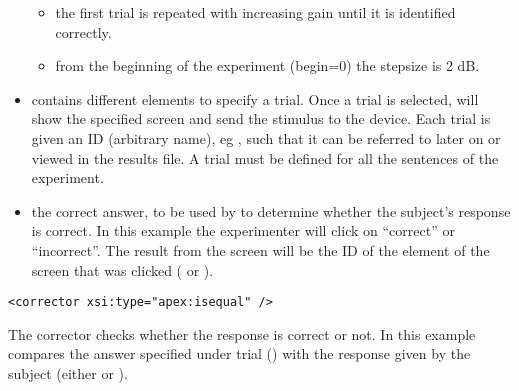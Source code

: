 \begin{itemize}
\begin{itemize}
\item {} the first trial is
repeated with increasing gain until it is identified correctly.

\item {} from the beginning of the experiment
(begin=0) the stepsize is 2 dB.
\end{itemize}

\item {} contains different  elements
to specify a trial. Once a trial is selected, 
will show the specified screen and send the stimulus to the
device. Each trial is given an ID (arbitrary name), eg
, such that it can be referred to later on or
viewed in the results file. A trial must be defined for all the
sentences of the experiment.

\item {} the correct answer, to be used by \apex to
determine whether the subject's response is correct. In this
example the experimenter will click on ``correct'' or
``incorrect''. The result from the screen will be the ID of the
element of the screen that was clicked ( or
).

\end{itemize}
















\begin{lstlisting}
<corrector xsi:type="apex:isequal" />
\end{lstlisting}

The corrector checks whether the response is correct or not. In
this example  compares the answer specified
under trial () with the response given by the
subject (either  or ).

